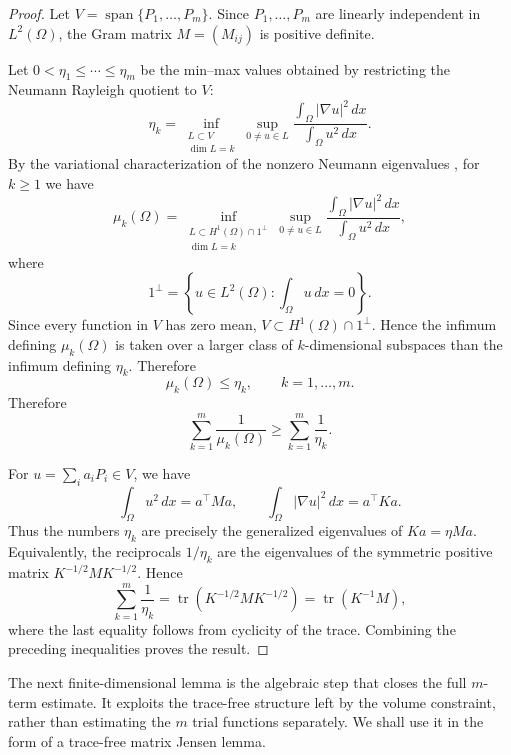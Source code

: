\documentclass[11pt,letterpaper,reqno]{amsart}
\theoremstyle{definition}
\DeclareMathOperator{\tr}{tr}
\DeclareMathOperator{\spanop}{span}
\begin{document}
\begin{proof}
Let \(V=\spanop\{P_1,\ldots,P_m\}\). Since
\(P_1,\ldots,P_m\) are linearly independent in \(L^2(\Omega)\), the Gram
matrix \(M=(M_{ij})\) is positive definite.

Let \(0<\eta_1\leq\cdots\leq\eta_m\) be the min--max values obtained by
restricting the Neumann Rayleigh quotient to \(V\):
\[
        \eta_k=
        \inf_{\substack{L\subset V\\ \dim L=k}}
        \sup_{0\neq u\in L}
        \frac{\int_\Omega |\nabla u|^2\,dx}
             {\int_\Omega u^2\,dx}.
\]
By the variational characterization of the nonzero Neumann eigenvalues \cite[Theorem~3.1.11]{LMP23}, for \(k\geq1\) we have
\[
        \mu_k(\Omega)
        =
        \inf_{\substack{L\subset H^1(\Omega)\cap 1^\perp\\
                        \dim L=k}}
        \sup_{0\neq u\in L}
        \frac{\int_\Omega |\nabla u|^2\,dx}
             {\int_\Omega u^2\,dx},
\]
where
\[
        1^\perp
        =
        \left\{u\in L^2(\Omega):\int_\Omega u\,dx=0\right\}.
\]
Since every function in \(V\) has zero mean, \(V\subset H^1(\Omega)\cap
1^\perp\). Hence the infimum defining \(\mu_k(\Omega)\) is taken over a
larger class of \(k\)-dimensional subspaces than the infimum defining
\(\eta_k\). Therefore
\[
        \mu_k(\Omega)\leq \eta_k,
        \qquad k=1,\ldots,m.
\]
Therefore
\[
        \sum_{k=1}^m\frac1{\mu_k(\Omega)}
        \geq
        \sum_{k=1}^m\frac1{\eta_k}.
\]

For \(u=\sum_i a_iP_i\in V\), we have
\[
        \int_\Omega u^2\,dx=a^\top Ma,
        \qquad
        \int_\Omega |\nabla u|^2\,dx=a^\top Ka.
\]
Thus the numbers \(\eta_k\) are precisely the generalized eigenvalues of
\(Ka=\eta Ma\). Equivalently, the reciprocals \(1/\eta_k\) are the
eigenvalues of the symmetric positive matrix \(K^{-1/2}MK^{-1/2}\).
Hence
\[
        \sum_{k=1}^m\frac1{\eta_k}
        =
        \tr(K^{-1/2}MK^{-1/2})
        =
        \tr(K^{-1}M),
\]
where the last equality follows from cyclicity of the trace. Combining
the preceding inequalities proves the result.
\end{proof}

















The next finite-dimensional lemma is the algebraic step that closes the
full \(m\)-term estimate. It exploits the trace-free structure left by the
volume constraint, rather than estimating the \(m\) trial functions
separately. We shall use it in the form of a trace-free matrix Jensen
lemma.
\end{document}

